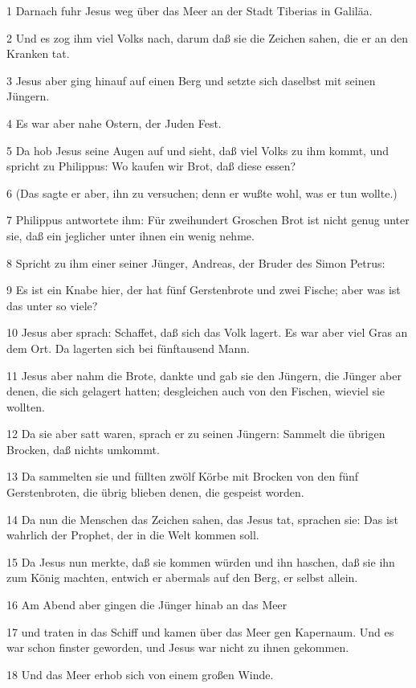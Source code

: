 \par 1 Darnach fuhr Jesus weg über das Meer an der Stadt Tiberias in Galiläa.
\par 2 Und es zog ihm viel Volks nach, darum daß sie die Zeichen sahen, die er an den Kranken tat.
\par 3 Jesus aber ging hinauf auf einen Berg und setzte sich daselbst mit seinen Jüngern.
\par 4 Es war aber nahe Ostern, der Juden Fest.
\par 5 Da hob Jesus seine Augen auf und sieht, daß viel Volks zu ihm kommt, und spricht zu Philippus: Wo kaufen wir Brot, daß diese essen?
\par 6 (Das sagte er aber, ihn zu versuchen; denn er wußte wohl, was er tun wollte.)
\par 7 Philippus antwortete ihm: Für zweihundert Groschen Brot ist nicht genug unter sie, daß ein jeglicher unter ihnen ein wenig nehme.
\par 8 Spricht zu ihm einer seiner Jünger, Andreas, der Bruder des Simon Petrus:
\par 9 Es ist ein Knabe hier, der hat fünf Gerstenbrote und zwei Fische; aber was ist das unter so viele?
\par 10 Jesus aber sprach: Schaffet, daß sich das Volk lagert. Es war aber viel Gras an dem Ort. Da lagerten sich bei fünftausend Mann.
\par 11 Jesus aber nahm die Brote, dankte und gab sie den Jüngern, die Jünger aber denen, die sich gelagert hatten; desgleichen auch von den Fischen, wieviel sie wollten.
\par 12 Da sie aber satt waren, sprach er zu seinen Jüngern: Sammelt die übrigen Brocken, daß nichts umkommt.
\par 13 Da sammelten sie und füllten zwölf Körbe mit Brocken von den fünf Gerstenbroten, die übrig blieben denen, die gespeist worden.
\par 14 Da nun die Menschen das Zeichen sahen, das Jesus tat, sprachen sie: Das ist wahrlich der Prophet, der in die Welt kommen soll.
\par 15 Da Jesus nun merkte, daß sie kommen würden und ihn haschen, daß sie ihn zum König machten, entwich er abermals auf den Berg, er selbst allein.
\par 16 Am Abend aber gingen die Jünger hinab an das Meer
\par 17 und traten in das Schiff und kamen über das Meer gen Kapernaum. Und es war schon finster geworden, und Jesus war nicht zu ihnen gekommen.
\par 18 Und das Meer erhob sich von einem großen Winde.
